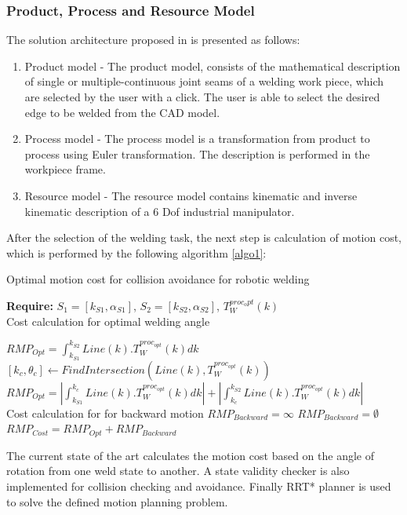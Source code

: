 \subsubsection{Product, Process and Resource Model}
The solution architecture proposed in \cite{17} is presented as follows:
\begin{enumerate}
\item Product model - The product model, consists of the mathematical description of single or multiple-continuous joint seams of a welding work piece, which are selected by the user with a click. The user is able to select the desired edge to be welded from the CAD model.
\item Process model - The process model is a transformation from product
to process using Euler transformation. The description is performed in the workpiece
frame.
\item Resource model - The resource model contains kinematic and inverse kinematic
description of a 6 Dof industrial manipulator.
\end{enumerate}
After the selection of the welding task, the next step is calculation of motion cost, which is performed by the following algorithm \ref{algo1}:

\begin{algorithm}
		\caption{Optimal motion cost for collision avoidance for
robotic welding}
		\label{algo1}
        \textbf{Require:} $S_{1}=[k_{S1},\alpha_{S1}]$, $S_{2}=[k_{S2},\alpha_{S2}]$, 			$T_{W}^{proc_opt}(k)$ \\
        {Cost calculation for optimal welding angle}
		\begin{algorithmic}[1]
            	\State $RMP_{Opt} = \int_{k_{S1}}^{k_{S2}}Line(k).T_{W}^{proc_{opt}}(k)dk$
			\Else
            \State $[k_{c},\theta_{c}] \gets FindIntersection(Line(k),T_{W}^{proc_{opt}}(k))$
            \State $RMP_{Opt} = |\int_{k_{S1}}^{k_{c}}Line(k).T_{W}^{proc_{opt}}(k)dk| + |\int_{k_{c}}^{k_{S2}}Line(k).T_{W}^{proc_{opt}}(k)dk|$
            \EndIf \\
            {Cost calculation for for backward motion}
			\State $RMP_{Backward} = \infty$
            \Else
            \State $RMP_{Backward} = \emptyset$
            \EndIf
			\State $RMP_{Cost} = RMP_{Opt} + RMP_{Backward}$
		\end{algorithmic}
	\end{algorithm}
The current state of the art calculates the motion cost based on the angle of rotation from one weld state to another. A state validity checker is also implemented for collision checking and avoidance. Finally RRT* planner is used to solve the defined motion planning problem.
